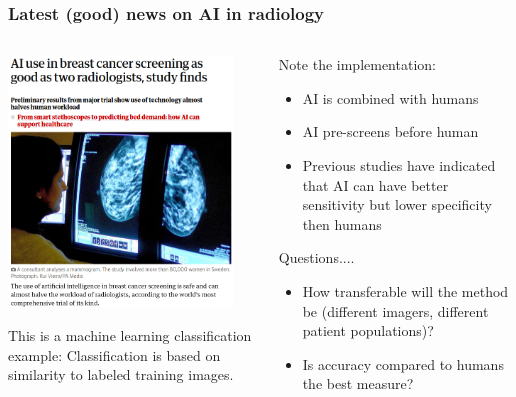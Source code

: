 \begin{frame}
\frametitle{Latest (good) news on AI in radiology}
\small
\begin{columns}[T]
    \begin{column}[T]{0.5\textwidth}
    \begin{center}
       \vspace{-5mm}
        \includegraphics[width=0.9\textwidth]{./misc_images/radiology_1}
        
    \end{center}
    \footnotesize{This is a machine learning classification example: Classification is based on similarity to labeled training images.}
        
    \end{column}


    \begin{column}{0.49\textwidth}
    
    
    Note the implementation:
    \begin{itemize}
    \item AI is combined with humans 
    \item AI pre-screens before human
    \item Previous studies have indicated that AI can have better sensitivity but lower specificity then humans
    \end{itemize}

    Questions....
    \begin{itemize}
    \item How transferable will the method be (different imagers, different patient populations)?
    \item Is accuracy compared to humans the best measure?
    \end{itemize}
    \end{column}
\end{columns}

\end{frame}